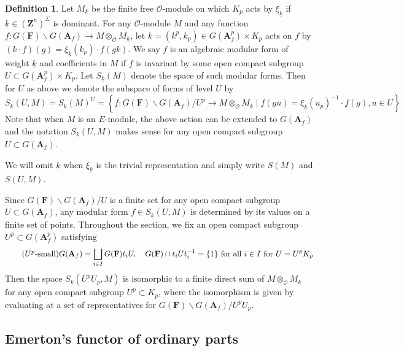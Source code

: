 \documentclass[leqno]{amsart}
\theoremstyle{definition}
\newtheorem{defn}[thm]{Definition}
\theoremstyle{remark}
\newcommand{\oo}{\mathcal{O}}
\newcommand{\Z}{{\mathbf{Z}}}
\newcommand{\A}{\mathbf A}
\newcommand{\F}{{\mathbf{F}}} %
\newcommand{\wt}[1]{\underline{ #1 }}
\begin{document}
\begin{defn}\label{def:algform}
Let $M_{\wt{k}}$ be the finite free $\oo$-module
on which $K_p$ acts by $\xi_{\wt{k}}$
if $\wt{k}\in (\Z^n)^{\Sigma}$ is dominant. 
For any $\oo$-module $M$ and any function
$f\colon G(\F)\backslash G(\A_f)\to M\otimes_{\oo}M_{\wt{k}}$,
let $k=(k^p,k_p)\in G(\A_f^p)\times K_p$ acts on $f$ by 
$(k\cdot f)(g)=\xi_{\wt{k}}(k_p)\cdot f(gk)$.
We say $f$ is an algebraic modular form of 
weight $\wt{k}$ and coefficients in $M$
if $f$ is invariant by some open compact subgroup
$U\subset G(\A_f^p)\times K_p$.
Let $S_{\wt{k}}(M)$
denote the space of such modular forms.
Then for $U$ as above we 
denote the subspace of forms
of level $U$ by
\begin{equation}
S_{\wt{k}}(U,M)=
S_{\wt{k}}(M)^U=
\left\{ f: G(\F)\backslash G(\A_f)/U^p 
\rightarrow M\otimes_{\oo}M_{\wt{k}}
\mid f(gu)=\xi_{\wt{k}}(u_p)^{-1}\cdot f(g), u\in U\right\} 
\end{equation}
Note that when $M$ is an  $E$-module,
the above action can be extended 
to  $G(\A_f)$
and the notation  $S_{\wt{k}}(U,M)$
makes sense for any open compact subgroup
$U\subset G(\A_f)$.

We will omit $\wt{k}$ 
when $\xi_{\wt{k}}$ is the trivial representation
and simply write
$S(M)$ and  $S(U,M)$.
\end{defn}


Since $G(\F)\backslash G(\A_f)/U$ is a finite set
for any open compact subgroup $U\subset G(\A_f)$,
any modular form $f\in S_{\wt{k}}(U,M)$ 
is determined by its values on a finite set of points.
Throughout the section,
we fix an open compact subgroup 
$U^p\subset G(\A_f^p)$ satisfying 
\begin{equation}\label{cond:small}\tag{$U^p$-\text{small}}
	G(\A_f)=\bigsqcup_{i\in I}
	G(\F)t_i U,\quad
	G(\F)\cap t_iUt_i^{-1}=\{1\} \text{ for all } i\in I
	\text{ for } U=U^pK_p
\end{equation}
Then the space $S_{\wt{k}}(U^pU_p,M)$ is
isomorphic to a finite direct sum of 
$M\otimes_{\oo}M_{\wt{k}}$
for any open compact subgroup $U^p\subset K_p$,
where the isomorphism
is given by 
evaluating at a set of representatives
for  $G(\F)\backslash G(\A_f)/U^pU_p$.

\subsection{Emerton's functor of ordinary parts}
\end{document}
